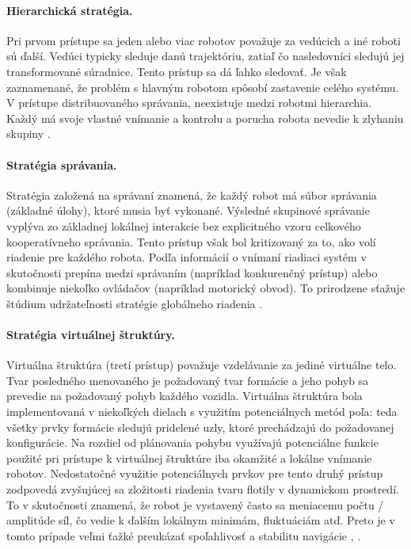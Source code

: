 \paragraph{Hierarchická stratégia.}
Pri prvom prístupe sa jeden alebo viac robotov považuje za vedúcich a iné roboti sú ďalší. Vedúci typicky sleduje danú
trajektóriu, zatiaľ čo nasledovníci sledujú jej transformované súradnice. Tento prístup sa dá ľahko sledovať.
Je však zaznamenané, že problém s hlavným robotom spôsobí zastavenie celého systému. V prístupe distribuovaného správania, 
neexistuje medzi robotmi hierarchia. Každý má svoje vlastné vnímanie a kontrolu a porucha robota nevedie k zlyhaniu
skupiny \citep{vascak}.

\paragraph{Stratégia správania.}
Stratégia založená na správaní znamená, že každý robot má súbor správania (základné úlohy), ktoré musia byť vykonané.
Výsledné skupinové správanie vyplýva zo základnej lokálnej interakcie bez explicitného vzoru celkového kooperatívneho
správania. Tento prístup však bol kritizovaný za to, ako volí riadenie pre každého robota. Podľa informácií o vnímaní
riadiaci systém v skutočnosti prepína medzi správaním (napríklad konkurenčný prístup) alebo kombinuje niekoľko
ovládačov (napríklad motorický obvod). To prirodzene sťažuje štúdium udržateľnosti stratégie globálneho riadenia \citep{ogren}.

\paragraph{Stratégia virtuálnej štruktúry.}
Virtuálna štruktúra (tretí prístup) považuje vzdelávanie za jediné virtuálne telo. Tvar posledného menovaného je
požadovaný tvar formácie a jeho pohyb sa prevedie na požadovaný pohyb každého vozidla. Virtuálna štruktúra
bola implementovaná v niekoľkých dielach s využitím potenciálnych metód poľa: teda všetky prvky formácie
sledujú pridelené uzly, ktoré prechádzajú do požadovanej konfigurácie. Na rozdiel od plánovania
pohybu využívajú potenciálne funkcie použité pri prístupe k virtuálnej štruktúre iba okamžité a lokálne vnímanie
robotov. Nedostatočné využitie potenciálnych prvkov pre tento druhý prístup zodpovedá zvyšujúcej sa zložitosti riadenia
tvaru flotily v dynamickom prostredí. To v skutočnosti znamená, že robot je vystavený často sa meniacemu počtu /
amplitúde síl, čo vedie k ďalším lokálnym minimám, fluktuáciám atď. Preto je v tomto prípade veľmi ťažké preukázať
spoľahlivosť a stabilitu navigácie \citep{ogren}, \citep{vascak}.



